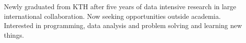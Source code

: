 

\begin{cvparagraph}

Newly graduated from KTH after five years of data intensive research in large international collaboration. 
Now seeking opportunities outside academia.
Interested in programming, data analysis and problem solving and learning new things. 

\end{cvparagraph}